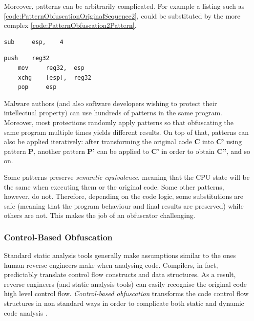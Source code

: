 \documentclass[pdfa%
,cucitura%
]{toptesi}
\begin{document}
Moreover, patterns can be arbitrarily complicated. For example a listing such as \ref{code:PatternObfuscationOriginalSequence2}, could be substituted by the more complex \ref{code:PatternObfuscation2Pattern}.

\begin{lstlisting}[caption={Original sequence \#2}, label=code:PatternObfuscationOriginalSequence2, language={[x86masm]Assembler}, style=mystyle]
	sub		esp,	4
\end{lstlisting}

\begin{lstlisting}[caption={Obfuscation of sequence \#2}, label=code:PatternObfuscation2Pattern, language={[x86masm]Assembler}, style=mystyle]
	push	reg32
	mov		reg32,	esp
	xchg	[esp],	reg32
	pop		esp
\end{lstlisting}

Malware authors (and also software developers wishing to protect their intellectual property) can use hundreds of patterns in the same program. Moreover, most protections randomly apply patterns so that obfuscating the same program multiple times yields different results. On top of that, patterns can also be applied iteratively: after transforming the original code \textbf{C} into \textbf{C'} using pattern \textbf{P}, another pattern \textbf{P'} can be applied to \textbf{C'} in order to obtain \textbf{C''}, and so on.

Some patterns preserve \textit{semantic equivalence}, meaning that the CPU state will be the same when executing them or the original code. Some other patterns, however, do not. Therefore, depending on the code logic, some substitutions are safe (meaning that the program behaviour and final results are preserved) while others are not. This makes the job of an obfuscator challenging.

\subsubsection{Control-Based Obfuscation}
Standard static analysis tools generally make assumptions similar to the ones human reverse engineers make when analysing code. Compilers, in fact, predictably translate control flow constructs and data structures. As a result, reverse engineers (and static analysis tools) can easily recognise the original code high level control flow. \textit{Control-based obfuscation} transforms the code control flow structures in non standard ways in order to complicate both static and dynamic code analysis \cite{DangPRE}.
\end{document}
